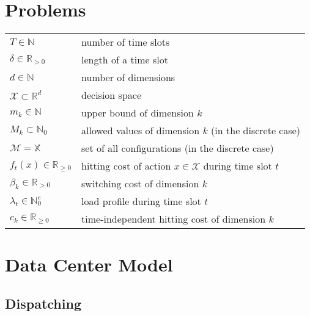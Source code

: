 \label{chapter:notation}

\section*{Problems}

\begin{tabularx}{\textwidth}{lX}
    $T \in \mathbb{N}$ & number of time slots \\
    $\delta \in \mathbb{R}_{>0}$ & length of a time slot \\
    $d \in \mathbb{N}$ & number of dimensions \\
    $\mathcal{X} \subset \mathbb{R}^d$ & decision space \\
    $m_k \in \mathbb{N}$ & upper bound of dimension $k$ \\
    $M_k \subset \mathbb{N}_0$ & allowed values of dimension $k$ (in the discrete case) \\
    $\mathcal{M} = \mathbb{X}$ & set of all configurations (in the discrete case) \\
    $f_t(x) \in \mathbb{R}_{\geq 0}$ & hitting cost of action $x \in \mathcal{X}$ during time slot $t$ \\
    $\beta_k \in \mathbb{R}_{>0}$ & switching cost of dimension $k$ \\
    $\lambda_t \in \mathbb{N}_0^e$ & load profile during time slot $t$ \\
    $c_k \in \mathbb{R}_{\geq 0}$ & time-independent hitting cost of dimension $k$ \\
\end{tabularx}

\vspace{\fill}

\section*{Data Center Model}

\subsection*{Dispatching}

